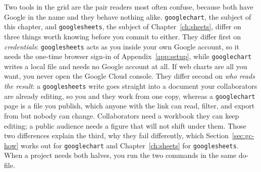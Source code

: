 Two tools in the grid are the pair readers most often confuse, because both have Google in the name and they behave nothing alike. \texttt{googlechart}, the subject of this chapter, and \texttt{googlesheets}, the subject of Chapter~\ref{ch:sheets}, differ on three things worth knowing before you commit to either. They differ first on \emph{credentials}: \texttt{googlesheets} acts as you inside your own Google account, so it needs the one-time browser sign-in of Appendix~\ref{app:setup}, while \texttt{googlechart} writes a local file and needs no Google account at all. If web charts are all you want, you never open the Google Cloud console. They differ second on \emph{who reads the result}: a \texttt{googlesheets} write goes straight into a document your collaborators are already editing, so you and they work from one copy, whereas a \texttt{googlechart} page is a file you publish, which anyone with the link can read, filter, and export from but nobody can change. Collaborators need a workbook they can keep editing; a public audience needs a figure that will not shift under them. Those two differences explain the third, why they fail differently, which Section~\ref{sec:gc-how} works out for \texttt{googlechart} and Chapter~\ref{ch:sheets} for \texttt{googlesheets}. When a project needs both halves, you run the two commands in the same do-file.

